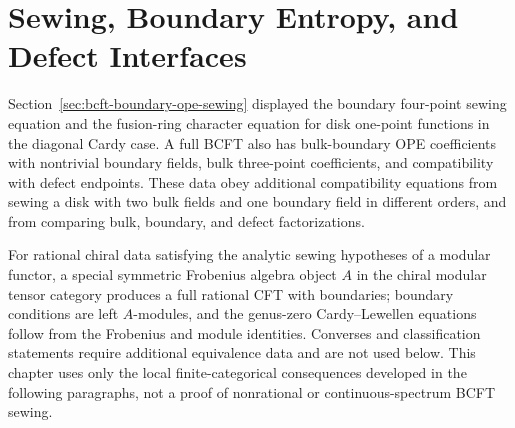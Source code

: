 \section{Sewing, Boundary Entropy, and Defect Interfaces}

Section~\ref{sec:bcft-boundary-ope-sewing} displayed the boundary
four-point sewing equation and the fusion-ring character equation for disk
one-point functions in the diagonal Cardy case.  A full BCFT also has
bulk-boundary OPE coefficients with nontrivial boundary fields, bulk
three-point coefficients, and compatibility with defect endpoints.  These
data obey additional compatibility equations from sewing a disk with two
bulk fields and one boundary field in different orders, and from comparing
bulk, boundary, and defect factorizations.

\begin{quotedtheorem}
\label{qthm:cardy-lewellen-sewing-status}
For rational chiral data satisfying the analytic sewing hypotheses of a
modular functor, a special symmetric Frobenius algebra object \(A\) in the
chiral modular tensor category produces a full rational CFT with boundaries;
boundary conditions are left \(A\)-modules, and the genus-zero
Cardy--Lewellen equations follow from the Frobenius and module identities.
Converses and classification statements require additional equivalence data
and are not used below.  This chapter uses only the local finite-categorical
consequences developed in the following paragraphs, not a proof of
nonrational or continuous-spectrum BCFT sewing.
\end{quotedtheorem}

